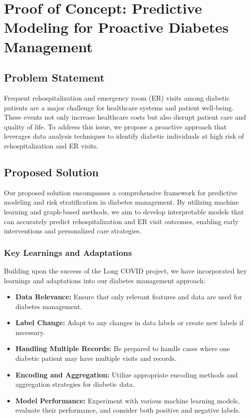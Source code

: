 \documentclass{article}
\begin{document}
\section{Proof of Concept: Predictive Modeling for Proactive Diabetes Management}

\subsection{Problem Statement}
Frequent rehospitalization and emergency room (ER) visits among diabetic patients are a major challenge for healthcare systems and patient well-being. These events not only increase healthcare costs but also disrupt patient care and quality of life. To address this issue, we propose a proactive approach that leverages data analysis techniques to identify diabetic individuals at high risk of rehospitalization and ER visits.

\subsection{Proposed Solution}
Our proposed solution encompasses a comprehensive framework for predictive modeling and risk stratification in diabetes management. By utilizing machine learning and graph-based methods, we aim to develop interpretable models that can accurately predict rehospitalization and ER visit outcomes, enabling early interventions and personalized care strategies.
\subsubsection{Key Learnings and Adaptations}
Building upon the success of the Long COVID project, we have incorporated key learnings and adaptations into our diabetes management approach:
\begin{itemize}
\item \textbf{Data Relevance:} Ensure that only relevant features and data are used for diabetes management.
\item \textbf{Label Change:} Adapt to any changes in data labels or create new labels if necessary.
\item \textbf{Handling Multiple Records:} Be prepared to handle cases where one diabetic patient may have multiple visits and records.
\item \textbf{Encoding and Aggregation:} Utilize appropriate encoding methods and aggregation strategies for diabetic data.
\item \textbf{Model Performance:} Experiment with various machine learning models, evaluate their performance, and consider both positive and negative labels.
\end{itemize}
\end{document}
